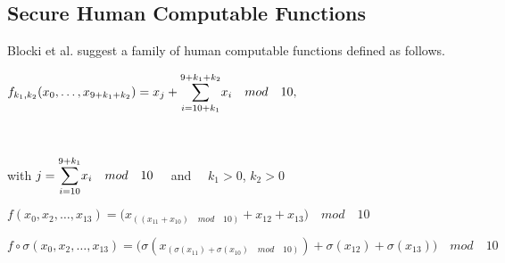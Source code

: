 \subsection{Secure Human Computable Functions}
Blocki et al. \cite{hcp-blocki} suggest a family of human computable functions defined as follows.
\centerline{ $ f_{k_1,k_2}(x_0,\dots,x_{9+k_1+k_2})= x_j + \mathlarger{\sum}\limits^{9+k_1+k_2}_{i=10+k_1} x_i \quad mod\quad 10,$}\\
\centerline{with $j = \mathlarger{\sum}\limits^{9+k_1}_{i=10} x_i \quad mod \quad 10\quad$ and $\quad k_1>0$, $k_2>0$ }
\vspace{2mm}


\begin{definition}
    \label{f-function}
    $f(x_0,x_2,\dots,x_{13}) = \big( x_{(( x_{11} + x_{10} )\quad mod \quad 10)} + x_{12} + x_{13} \big)\quad mod \quad 10$ 
\end{definition} 

\begin{definition}
    \label{fo-function}
    $f\circ \sigma(x_0,x_2,\dots,x_{13}) = \big(\sigma ( x_{(\sigma(x_{11}) + \sigma(x_{10})\quad mod \quad 10)} ) +\sigma ( x_{12} ) + \sigma( x_{13} )\big)\quad mod \quad 10$ 
\end{definition}

